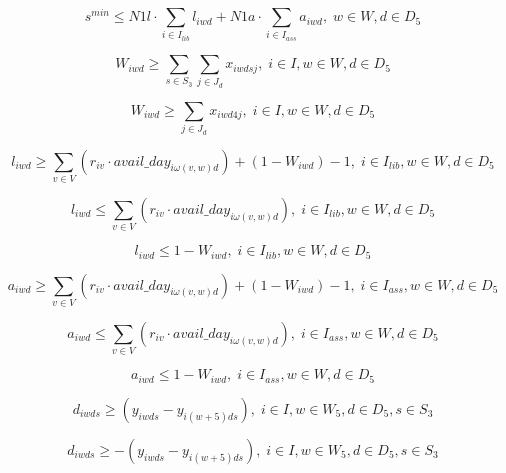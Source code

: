 \begin{equation}
s^{min} \leq N1l \cdot \sum_{i \in I_{lib}} l_{iwd} + N1a \cdot \sum_{i \in I_{ass}} a_{iwd}, \; w \in W, d \in D_5
\end{equation}

\begin{equation}
W_{iwd} \geq \sum_{s \in S_3} \sum_{j \in J_d} x_{iwdsj}, \; i \in I, w \in W, d \in D_5
\end{equation}

\begin{equation}
W_{iwd} \geq \sum_{j \in J_d} x_{iwd4j}, \; i \in I, w \in W, d \in D_5
\end{equation}

\begin{equation}
l_{iwd} \geq \sum_{v \in V} (r_{iv} \cdot avail\_day_{i\omega(v,w)d}) + (1-W_{iwd}) - 1, \; i \in I_{lib}, w \in W, d \in D_5
\end{equation}

\begin{equation}
l_{iwd} \leq \sum_{v \in V} (r_{iv} \cdot avail\_day_{i\omega(v,w)d}), \; i \in I_{lib}, w \in W, d \in D_5
\end{equation}

\begin{equation}
l_{iwd} \leq 1-W_{iwd}, \; i \in I_{lib}, w \in W, d \in D_5
\end{equation}

\begin{equation}
a_{iwd} \geq \sum_{v \in V} (r_{iv} \cdot avail\_day_{i\omega(v,w)d}) + (1-W_{iwd}) - 1, \; i \in I_{ass}, w \in W, d \in D_5
\end{equation}

\begin{equation}
a_{iwd} \leq \sum_{v \in V} (r_{iv} \cdot avail\_day_{i\omega(v,w)d}), \; i \in I_{ass}, w \in W, d \in D_5
\end{equation}

\begin{equation}
a_{iwd} \leq 1-W_{iwd}, \; i \in I_{ass}, w \in W, d \in D_5
\end{equation}

\begin{equation}
d_{iwds} \geq (y_{iwds} - y_{i(w+5)ds}), \; i \in I, w \in W_5, d \in D_5, s \in S_3
\end{equation}

\begin{equation}
d_{iwds} \geq -(y_{iwds} - y_{i(w+5)ds}), \; i \in I, w \in W_5, d \in D_5, s \in S_3
\end{equation}

